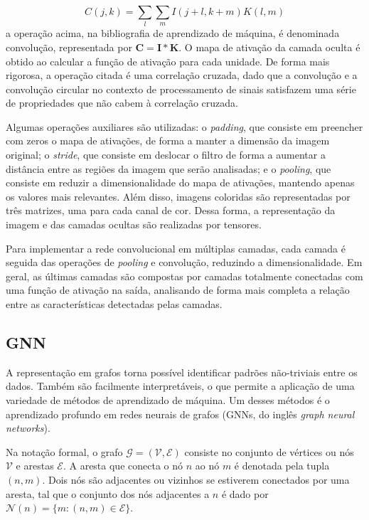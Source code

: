 \begin{equation}
    C(j, k) = \sum_{l} \sum_{m} I(j+l, k+m)K(l, m)
\end{equation}
a operação acima, na bibliografia de aprendizado de máquina, é denominada
convolução, representada por $\mathbf{C} = \mathbf{I} * \mathbf{K}$. O mapa de
ativação da camada oculta é obtido ao calcular a função de ativação para cada
unidade. De forma mais rigorosa, a operação citada é uma correlação cruzada, dado
que a convolução e a convolução circular no contexto de processamento de sinais
satisfazem uma série de propriedades que não cabem à correlação cruzada.

Algumas operações auxiliares são utilizadas: o \textit{padding}, que consiste em
preencher com zeros o mapa de ativações, de forma a manter a dimensão da imagem
original; o \textit{stride}, que consiste em deslocar o filtro de forma a
aumentar a distância entre as regiões da imagem que serão analisadas; e o
\textit{pooling}, que consiste em reduzir a dimensionalidade do mapa de
ativações, mantendo apenas os valores mais relevantes. Além disso, imagens
coloridas são representadas por três matrizes, uma para cada canal de cor. Dessa
forma, a representação da imagem e das camadas ocultas são realizadas por
tensores.

Para implementar a rede convolucional em múltiplas camadas, cada camada é
seguida das operações de \textit{pooling} e convolução, reduzindo a
dimensionalidade. Em geral, as últimas camadas são compostas por camadas
totalmente conectadas com uma função de ativação na saída, analisando de forma
mais completa a relação entre as características detectadas pelas camadas.

\subsection{GNN}
A representação em grafos torna possível identificar padrões
não-triviais entre os dados. Também são facilmente interpretáveis, o que
permite a aplicação de uma variedade de métodos de aprendizado de máquina. Um
desses métodos é o aprendizado profundo em redes neurais de grafos (GNNs, do
inglês \textit{graph neural networks}).


Na notação formal, o grafo $\mathcal{G} = (\mathcal{V}, \mathcal{E})$ consiste no conjunto de
vértices ou nós $\mathcal{V}$ e arestas $\mathcal{E}$. A aresta que conecta
o nó $n$ ao nó $m$ é denotada pela tupla $(n, m)$. Dois nós são adjacentes ou vizinhos
se estiverem conectados por uma aresta, tal que o conjunto dos nós adjacentes a $n$
é dado por $\mathcal{N}(n) = \{m : (n, m) \in \mathcal{E}\}$.

